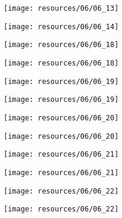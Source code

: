 \begin{frame}{ }
    \centering
    \texttt{[image: resources/06/06\_13]}
\end{frame}
\begin{frame}{ }
    \centering
    \texttt{[image: resources/06/06\_14]}
\end{frame}
\begin{frame}{ }
    \centering
    \texttt{[image: resources/06/06\_18]}
\end{frame}
\begin{frame}{ }
    \centering
    \texttt{[image: resources/06/06\_18]}
\end{frame}
\begin{frame}{ }
    \centering
    \texttt{[image: resources/06/06\_19]}
\end{frame}
\begin{frame}{ }
    \centering
    \texttt{[image: resources/06/06\_19]}
\end{frame}
\begin{frame}{ }
    \centering
    \texttt{[image: resources/06/06\_20]}
\end{frame}
\begin{frame}{ }
    \centering
    \texttt{[image: resources/06/06\_20]}
\end{frame}
\begin{frame}{ }
    \centering
    \texttt{[image: resources/06/06\_21]}
\end{frame}
\begin{frame}{ }
    \centering
    \texttt{[image: resources/06/06\_21]}
\end{frame}
\begin{frame}{ }
    \centering
    \texttt{[image: resources/06/06\_22]}
\end{frame}
\begin{frame}{ }
    \centering
    \texttt{[image: resources/06/06\_22]}
\end{frame}
